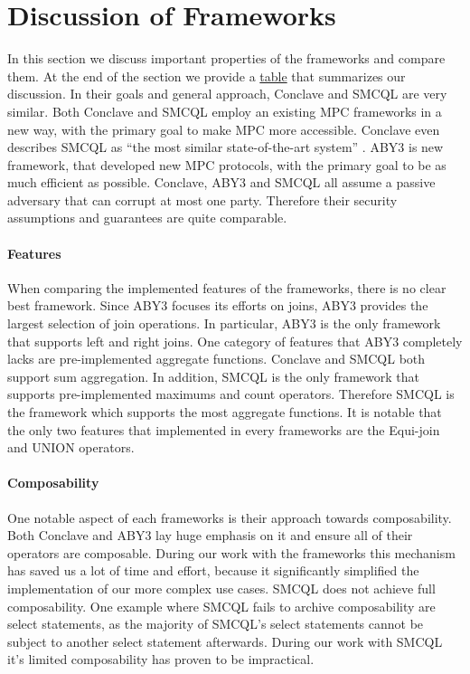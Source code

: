 \section{Discussion of Frameworks}
In this section we discuss important properties of the frameworks and compare them. 
At the end of the section we provide a \hyperref[Summary]{table} that summarizes our discussion.
In their goals and general approach, Conclave and SMCQL are very similar. Both Conclave and SMCQL employ an existing MPC frameworks in a new way, with the primary goal to make MPC more accessible. Conclave even describes SMCQL as ``the most similar state-of-the-art system'' \cite{10.1145/3302424.3303982}. ABY3 is new framework, that developed new MPC protocols, with the primary goal to be as much efficient as possible. 
Conclave, ABY3 and SMCQL all assume a passive adversary that can corrupt at most one party. Therefore their security assumptions and guarantees are quite comparable. 
\paragraph{Features} 
When comparing the implemented features of the frameworks, there is no clear best framework. Since ABY3 focuses its efforts on joins, ABY3 provides the largest selection of join operations. In particular, ABY3 is the only framework that supports left and right joins. One category of features that ABY3 completely lacks are pre-implemented aggregate functions. Conclave and SMCQL both support sum aggregation. In addition, SMCQL is the only framework that supports pre-implemented maximums and count operators. Therefore SMCQL is the framework which supports the most aggregate functions. It is notable that the only two features that implemented in every frameworks are the Equi-join and UNION operators.  
\paragraph{Composability}
One notable aspect of each frameworks is their approach towards composability. Both Conclave and ABY3 lay huge emphasis on it and ensure all of their operators are composable. During our work with the frameworks this mechanism has saved us a lot of time and effort, because it significantly simplified the implementation of our more complex use cases.
SMCQL does not achieve full composability. One example where SMCQL fails to archive composability are select statements, as the majority of SMCQL's select statements cannot be subject to another select statement afterwards. During our work with SMCQL it's limited composability has proven to be impractical. 
